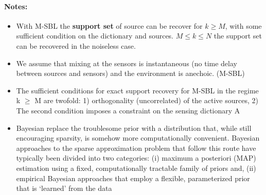 \paragraph{Notes:}
\begin{itemize}
\item With M-SBL the \textbf{support set} of source can be recover for $k \geq M$, with some sufficient condition on the dictionary and sources. $M \leq k \leq N$ the support set can be recovered in the noiseless case.
\item We assume that mixing at the sensors is instantaneous (no time delay between sources and sensors) and the environment is anechoic. (M-SBL)
\item The sufficient conditions for exact support recovery for M-SBL in the regime k $\geq$ M are twofold: 1) orthogonality (uncorrelated) of the active sources, 2) The second condition imposes a constraint on the sensing dictionary A
\item Bayesian replace the troublesome prior with a distribution that, while still encouraging sparsity, is somehow more computationally convenient. Bayesian approaches to the sparse approximation problem that follow this route have typically been divided into two categories: (i) maximum a posteriori (MAP) estimation using a fixed, computationally tractable family of priors and, (ii) empirical Bayesian approaches that employ a flexible, parameterized prior that is ‘learned’ from the data
\end{itemize}